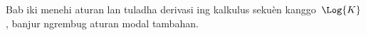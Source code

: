 \documentclass[../../../include/open-logic-chapter]{subfiles}
\begin{document}
\begin{editorial}
Bab iki menehi aturan lan tuladha derivasi ing kalkulus sekuèn kanggo~$\Log{K}$, banjur ngrembug aturan modal tambahan.
\end{editorial}


\OLEndChapterHook
\end{document}
